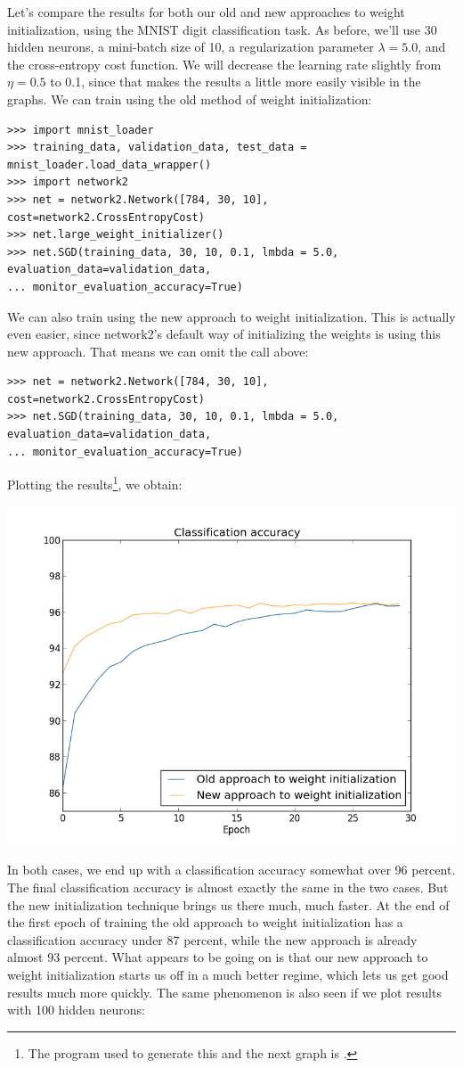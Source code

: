 \documentclass[a4paper,twoside,10pt]{book}
\begin{document}
Let's compare the results for both our old and new approaches to weight initialization, using the MNIST digit classification task. As before, we'll use 30 hidden neurons, a mini-batch size of 10, a regularization parameter $\lambda=5.0$, and the cross-entropy cost function. We will decrease the learning rate slightly from $\eta=0.5$ to 0.1, since that makes the results a little more easily visible in the graphs. We can train using the old method of weight initialization:
\begin{lstlisting}
>>> import mnist_loader
>>> training_data, validation_data, test_data =  mnist_loader.load_data_wrapper()
>>> import network2
>>> net = network2.Network([784, 30, 10], cost=network2.CrossEntropyCost)
>>> net.large_weight_initializer()
>>> net.SGD(training_data, 30, 10, 0.1, lmbda = 5.0,  evaluation_data=validation_data, 
... monitor_evaluation_accuracy=True)
\end{lstlisting}
We can also train using the new approach to weight initialization. This is actually even easier, since network2's default way of initializing the weights is using this new approach. That means we can omit the  call above: 
\begin{lstlisting}
>>> net = network2.Network([784, 30, 10], cost=network2.CrossEntropyCost)
>>> net.SGD(training_data, 30, 10, 0.1, lmbda = 5.0, evaluation_data=validation_data, 
... monitor_evaluation_accuracy=True)
\end{lstlisting}
Plotting the results\footnote{The program used to generate this and the next graph is .}, we obtain:
\begin{center}
	\includegraphics[width=0.7\linewidth]{figures/ch3/weight_initialization_30}
\end{center}
In both cases, we end up with a classification accuracy somewhat over 96 percent. The final classification accuracy is almost exactly the same in the two cases. But the new initialization technique brings us there much, much faster. At the end of the first epoch of training the old approach to weight initialization has a classification accuracy under 87 percent, while the new approach is already almost 93 percent. What appears to be going on is that our new approach to weight initialization starts us off in a much better regime, which lets us get good results much more quickly. The same phenomenon is also seen if we plot results with 100 hidden neurons:
\end{document}
